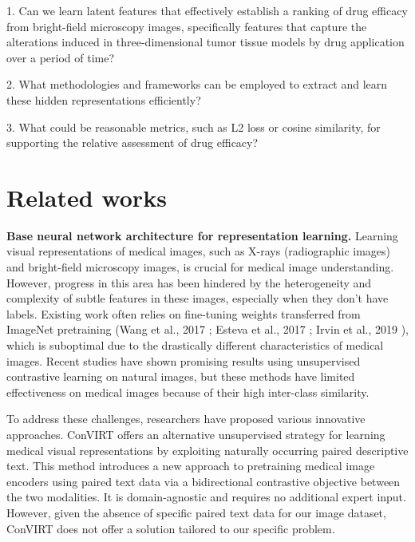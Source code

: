 \documentclass[12pt,twoside,a4paper,parskip]{scrbook} %
\begin{document}
1. Can we learn latent features that effectively establish a ranking of drug efficacy from bright-field microscopy images, specifically features that capture the alterations induced in three-dimensional tumor tissue models by drug application over a period of time?

2. What methodologies and frameworks can be employed to extract and learn these hidden representations efficiently?

3. What could be reasonable metrics, such as L2 loss or cosine similarity, for supporting the relative assessment of drug efficacy?

\chapter{Related works}\label{ch:Related works}
\textbf{Base neural network architecture for representation learning.} Learning visual representations of medical images, such as X-rays (radiographic images) and bright-field microscopy images, is crucial for medical image understanding. However, progress in this area has been hindered by the heterogeneity and complexity of subtle features in these images, especially when they don't have labels. Existing work often relies on fine-tuning weights transferred from ImageNet pretraining (Wang et al., 2017 \cite{8099852} ; Esteva et al., 2017 \cite{Esteva2017Dermatologist} ; Irvin et al., 2019 \cite{irvin2019chexpert} ), which is suboptimal due to the drastically different characteristics of medical images. Recent studies have shown promising results using unsupervised contrastive learning on natural images, but these methods have limited effectiveness on medical images because of their high inter-class similarity.

To address these challenges, researchers have proposed various innovative approaches. ConVIRT \cite{zhang2022contrastive} offers an alternative unsupervised strategy for learning medical visual representations by exploiting naturally occurring paired descriptive text. This method introduces a new approach to pretraining medical image encoders using paired text data via a bidirectional contrastive objective between the two modalities. It is domain-agnostic and requires no additional expert input.  However, given the absence of specific paired text data for our image dataset, ConVIRT does not offer a solution tailored to our specific problem.
\end{document}
